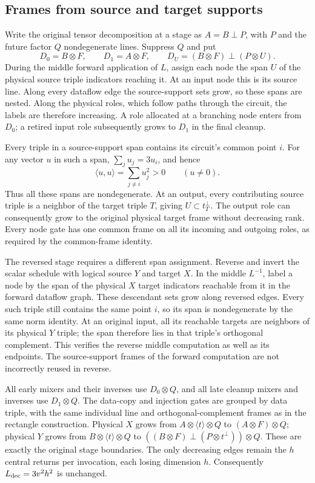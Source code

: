 \subsection{Frames from source and target supports}
Write the original tensor decomposition at a stage as
$A=B\mathbin\perp P$, with $P$ and the future factor $Q$ nondegenerate lines.
Suppress $Q$ and put
\[
 D_0=B\otimes F,\qquad D_1=A\otimes F,\qquad
 D_U=(B\otimes F)\mathbin\perp(P\otimes U).
\]
During the middle forward application of $L$, assign each node the span $U$
of the physical source triple indicators reaching it. At an input node this
is its source line. Along every dataflow edge the source-support sets grow,
so these spans are nested. Along the physical roles, which follow paths
through the circuit, the labels are therefore increasing. A role allocated
at a branching node enters from $D_0$; a retired input role subsequently
grows to $D_1$ in the final cleanup.

Every triple in a source-support span contains its circuit's common point
$i$. For any vector $u$ in such a span, $\sum_j u_j=3u_i$, and hence
\[
 \langle u,u\rangle=\sum_{j\ne i}u_j^2>0\qquad(u\ne0).
\]
Thus all these spans are nondegenerate. At an output, every contributing
source triple is a neighbor of the target triple $T$, giving
$U\subset t_T^\perp$. The output role can consequently grow to the original
physical target frame without decreasing rank. Every node gate has one
common frame on all its incoming and outgoing roles, as required by the
common-frame identity.

The reversed stage requires a different span assignment. Reverse and invert
the scalar schedule with logical source $Y$ and target $X$. In the middle
$L^{-1}$, label a node by the span of the physical $X$ target indicators
reachable from it in the forward dataflow graph. These descendant sets grow
along reversed edges. Every such triple still contains the same point $i$,
so its span is nondegenerate by the same norm identity. At an original input,
all its reachable targets are neighbors of its physical $Y$ triple; the span
therefore lies in that triple's orthogonal complement. This verifies the
reverse middle computation as well as its endpoints. The source-support
frames of the forward computation are not incorrectly reused in reverse.

All early mixers and their inverses use $D_0\otimes Q$, and all late cleanup
mixers and inverses use $D_1\otimes Q$. The data-copy and injection gates are
grouped by data triple, with the same individual line and orthogonal-complement
frames as in the rectangle construction. Physical $X$ grows from
$A\otimes\langle t\rangle\otimes Q$ to $(A\otimes F)\otimes Q$;
physical $Y$ grows from $B\otimes\langle t\rangle\otimes Q$ to
$((B\otimes F)\mathbin\perp(P\otimes t^\perp))\otimes Q$.
These are exactly the original stage boundaries. The only decreasing edges
remain the $h$ central returns per invocation, each losing dimension $h$.
Consequently $L_{\rm dec}=3v^2h^2$ is unchanged.


